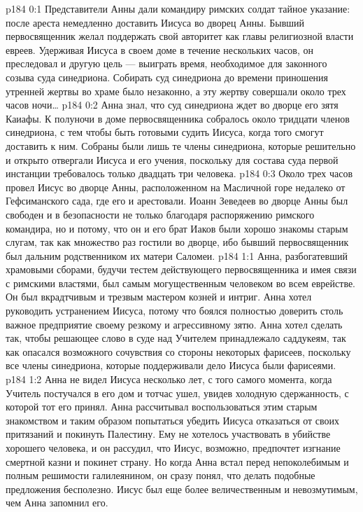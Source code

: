 \author{Комиссия срединников}
\vs p184 0:1 Представители Анны дали командиру римских солдат тайное указание: после ареста немедленно доставить Иисуса во дворец Анны. Бывший первосвященник желал поддержать свой авторитет как главы религиозной власти евреев. Удерживая Иисуса в своем доме в течение нескольких часов, он преследовал и другую цель --- выиграть время, необходимое для законного созыва суда синедриона. Собирать суд синедриона до времени приношения утренней жертвы во храме было незаконно, а эту жертву совершали около трех часов ночи\ldots
\vs p184 0:2 Анна знал, что суд синедриона ждет во дворце его зятя Каиафы. К полуночи в доме первосвященника собралось около тридцати членов синедриона, с тем чтобы быть готовыми судить Иисуса, когда того смогут доставить к ним. Собраны были лишь те члены синедриона, которые решительно и открыто отвергали Иисуса и его учения, поскольку для состава суда первой инстанции требовалось только двадцать три человека.
\vs p184 0:3 Около трех часов провел Иисус во дворце Анны, расположенном на Масличной горе недалеко от Гефсиманского сада, где его и арестовали. Иоанн Зеведеев во дворце Анны был свободен и в безопасности не только благодаря распоряжению римского командира, но и потому, что он и его брат Иаков были хорошо знакомы старым слугам, так как множество раз гостили во дворце, ибо бывший первосвященник был дальним родственником их матери Саломеи.
\vs p184 1:1 Анна, разбогатевший храмовыми сборами, будучи тестем действующего первосвященника и имея связи с римскими властями, был самым могущественным человеком во всем еврействе. Он был вкрадтчивым и трезвым мастером козней и интриг. Анна хотел руководить устранением Иисуса, потому что боялся полностью доверить столь важное предприятие своему резкому и агрессивному зятю. Анна хотел сделать так, чтобы решающее слово в суде над Учителем принадлежало саддукеям, так как опасался возможного сочувствия со стороны некоторых фарисеев, поскольку все члены синедриона, которые поддерживали дело Иисуса были фарисеями.
\vs p184 1:2 Анна не видел Иисуса несколько лет, с того самого момента, когда Учитель постучался в его дом и тотчас ушел, увидев холодную сдержанность, с которой тот его принял. Анна рассчитывал воспользоваться этим старым знакомством и таким образом попытаться убедить Иисуса отказаться от своих притязаний и покинуть Палестину. Ему не хотелось участвовать в убийстве хорошего человека, и он рассудил, что Иисус, возможно, предпочтет изгнание смертной казни и покинет страну. Но когда Анна встал перед непоколебимым и полным решимости галилеянином, он сразу понял, что делать подобные предложения бесполезно. Иисус был еще более величественным и невозмутимым, чем Анна запомнил его.
